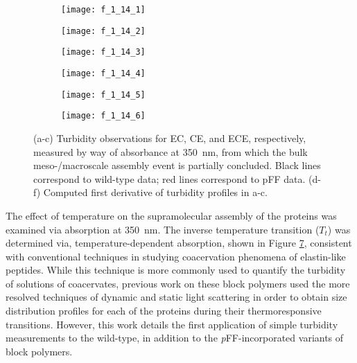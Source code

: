 \begin{refsection}
\begin{figure}[h!]
    \centering
    \begin{subfigure}[b]{0.32\textwidth}
        \texttt{[image: f\_1\_14\_1]}
        \caption{}
        \label{fig:LCST_ECpFF}
    \end{subfigure}
    \begin{subfigure}[b]{0.32\textwidth}
        \texttt{[image: f\_1\_14\_2]}
        \caption{}
        \label{fig:LCST_CEpFF}
    \end{subfigure}
    \begin{subfigure}[b]{0.32\textwidth}
        \texttt{[image: f\_1\_14\_3]}
        \caption{}
        \label{fig:LCST_ECEpFF}
    \end{subfigure}

    \begin{subfigure}[b]{0.32\textwidth}
        \texttt{[image: f\_1\_14\_4]}
        \caption{}
        \label{fig:LCST_deriv_ECpFF}
    \end{subfigure}
    \begin{subfigure}[b]{0.32\textwidth}
        \texttt{[image: f\_1\_14\_5]}
        \caption{}
        \label{fig:LCST_deriv_CEpFF}
    \end{subfigure}
    \begin{subfigure}[b]{0.32\textwidth}
        \texttt{[image: f\_1\_14\_6]}
        \caption{}
        \label{fig:LCST_deriv_ECEpFF}
    \end{subfigure}
    \caption{(a-c) Turbidity observations for EC, CE, and ECE, respectively,
        measured by way of absorbance at \SI{350}{\nm}, from which the bulk
        meso-/macroscale assembly event is partially concluded. Black lines
        correspond to wild-type data; red lines correspond to pFF data. (d-f)
    Computed first derivative of turbidity profiles in a-c.}
    \label{fig:lcst}
\end{figure}
The effect of temperature on the supramolecular assembly of the proteins was
examined via absorption at \SI{350}{\nm}. The inverse temperature transition
(${T_t}$) was determined via, temperature-dependent absorption, shown in Figure
\ref{fig:lcst}, consistent with conventional techniques in studying coacervation
phenomena of elastin-like peptides.\cite{Urry1985} While this technique is more
commonly used to quantify the turbidity of solutions of coacervates, previous
work on these block polymers used the more resolved techniques of dynamic and
static light scattering in order to obtain size distribution profiles for each
of the proteins during their thermoresponsive transitions. However, this work
details the first application of simple turbidity measurements to the
wild-type, in addition to the \emph{p}FF-incorporated variants of block polymers.


\end{refsection}
